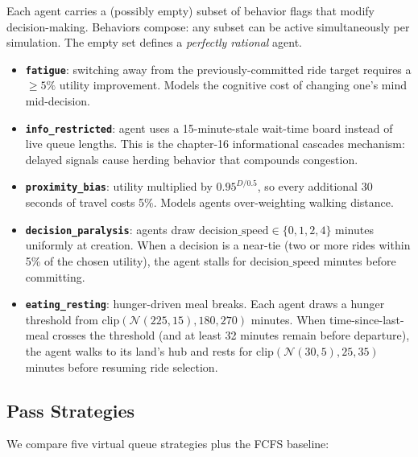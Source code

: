 \documentclass[11pt]{article}
\begin{document}
Each agent carries a (possibly empty) subset of behavior flags that modify decision-making. Behaviors compose: any subset can be active simultaneously per simulation. The empty set defines a \emph{perfectly rational} agent.

\begin{itemize}[nosep]
    \item \textbf{\texttt{fatigue}}: switching away from the previously-committed ride target requires a $\geq 5\%$ utility improvement. Models the cognitive cost of changing one's mind mid-decision.
    \item \textbf{\texttt{info\_restricted}}: agent uses a 15-minute-stale wait-time board instead of live queue lengths. This is the chapter-16 informational cascades mechanism: delayed signals cause herding behavior that compounds congestion.
    \item \textbf{\texttt{proximity\_bias}}: utility multiplied by $0.95^{D / 0.5}$, so every additional 30 seconds of travel costs 5\%. Models agents over-weighting walking distance.
    \item \textbf{\texttt{decision\_paralysis}}: agents draw $\text{decision\_speed} \in \{0, 1, 2, 4\}$ minutes uniformly at creation. When a decision is a near-tie (two or more rides within 5\% of the chosen utility), the agent stalls for $\text{decision\_speed}$ minutes before committing.
    \item \textbf{\texttt{eating\_resting}}: hunger-driven meal breaks. Each agent draws a hunger threshold from $\text{clip}(\mathcal{N}(225, 15), 180, 270)$ minutes. When time-since-last-meal crosses the threshold (and at least 32 minutes remain before departure), the agent walks to its land's hub and rests for $\text{clip}(\mathcal{N}(30, 5), 25, 35)$ minutes before resuming ride selection.
\end{itemize}

\subsection{Pass Strategies}

We compare five virtual queue strategies plus the FCFS baseline:
\end{document}
